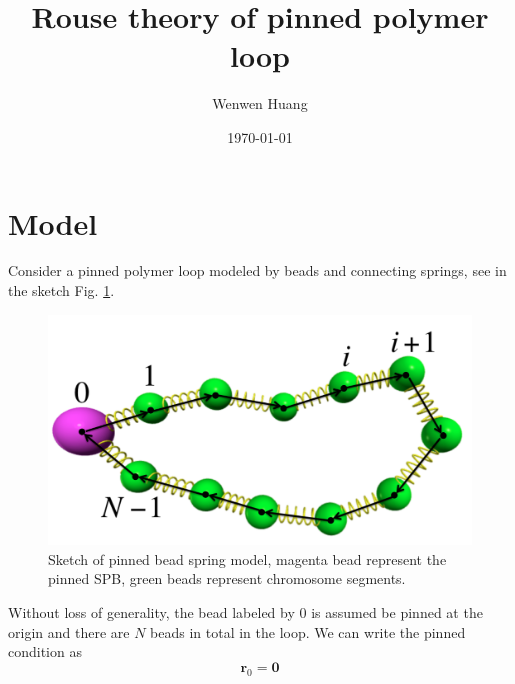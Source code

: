 \documentclass[12pt,a4paper]{article}
\begin{document}
\title{Rouse theory of pinned polymer loop}
\author{Wenwen Huang}
\date{\today}

\maketitle

\section{Model}
\label{sec:model}

Consider a pinned polymer loop modeled by beads and connecting springs, see in
the sketch Fig. \ref{fig:beadSpring}.
\begin{figure}[htpb]
    \centering
    \includegraphics[width=0.8\linewidth]{beadSpring}
    \caption{Sketch of pinned bead spring model, magenta bead represent the
        pinned SPB, green beads represent chromosome segments.}
    \label{fig:beadSpring}
\end{figure}
Without loss of generality, the bead labeled by $0$ is assumed be pinned at the
origin and there are $N$ beads in total in the loop. We can write the pinned
condition as 
\begin{equation}
    \label{eq:pinCondition}
    \mathbf{r}_0 = \mathbf{0}
\end{equation}
\end{document}
